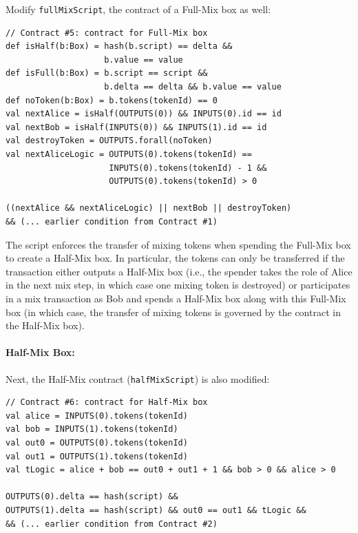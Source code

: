 \documentclass[runningheads]{llncs}
\begin{document}
Modify \texttt{fullMixScript}, the contract of a Full-Mix box as well:

{\small
\begin{Verbatim}[frame=single]
// Contract #5: contract for Full-Mix box
def isHalf(b:Box) = hash(b.script) == delta && 
                    b.value == value
def isFull(b:Box) = b.script == script &&
                    b.delta == delta && b.value == value
def noToken(b:Box) = b.tokens(tokenId) == 0
val nextAlice = isHalf(OUTPUTS(0)) && INPUTS(0).id == id
val nextBob = isHalf(INPUTS(0)) && INPUTS(1).id == id
val destroyToken = OUTPUTS.forall(noToken)
val nextAliceLogic = OUTPUTS(0).tokens(tokenId) == 
                     INPUTS(0).tokens(tokenId) - 1 && 
                     OUTPUTS(0).tokens(tokenId) > 0

((nextAlice && nextAliceLogic) || nextBob || destroyToken) 
&& (... earlier condition from Contract #1)
\end{Verbatim}
}

The script enforces the transfer of mixing tokens when spending the Full-Mix box to create a Half-Mix box. In particular, the tokens can only be transferred if the transaction either outputs a Half-Mix box (i.e., the spender takes the role of Alice in the next mix step, in which case one mixing token is destroyed) or participates in a mix transaction as Bob and spends a Half-Mix box along with this Full-Mix box (in which case, the transfer of mixing tokens is governed by the contract in the Half-Mix box).

\paragraph{Half-Mix Box:}
Next, the Half-Mix contract (\texttt{halfMixScript}) is also modified:
{\small
\begin{Verbatim}[frame=single]
// Contract #6: contract for Half-Mix box
val alice = INPUTS(0).tokens(tokenId)
val bob = INPUTS(1).tokens(tokenId)
val out0 = OUTPUTS(0).tokens(tokenId)
val out1 = OUTPUTS(1).tokens(tokenId)
val tLogic = alice + bob == out0 + out1 + 1 && bob > 0 && alice > 0 
  
OUTPUTS(0).delta == hash(script) && 
OUTPUTS(1).delta == hash(script) && out0 == out1 && tLogic &&
&& (... earlier condition from Contract #2)
\end{Verbatim}
}
\end{document}
